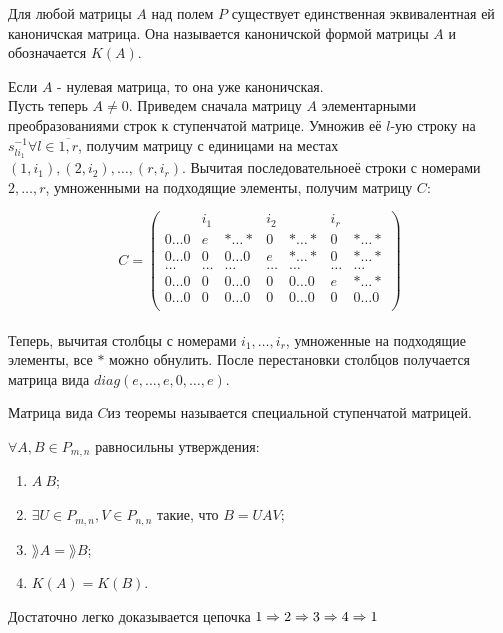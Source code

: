 \begin{proofs}
	Для любой матрицы $A$ над полем $P$ существует единственная эквивалентная ей каноничская матрица.
  Она называется каноничской формой матрицы $A$ и обозначается $K(A)$.
	\begin{dokvo}
    Если $A$ - нулевая матрица, то она уже каноничская.\\
    Пусть теперь $A \neq 0$. Приведем сначала матрицу $A$ элементарными преобразованиями строк к ступенчатой матрице.
    Умножив её $l$-ую строку на $s^{-1}_{li_1} \forall l \in \overline{1, r}$, получим матрицу
    с единицами на местах $(1, i_1), (2, i_2), \ldots, (r, i_r)$. Вычитая последовательноеё строки с номерами $2, \ldots, r$, умноженными
    на подходящие элементы, получим матрицу $C$:


    $$C =
    \begin{pmatrix}
      & i_1 & & i_2 & & i_r & \\
      0\ldots0 & e & *\ldots* & 0 & *\ldots* & 0 & *\ldots* \\
      0\ldots0 & 0 & 0\ldots0 & e & *\ldots* & 0 & *\ldots* \\
      \ldots & \ldots & \ldots & \ldots & \ldots & \ldots & \ldots \\
      0\ldots0 & 0 & 0\ldots0 & 0 & 0\ldots0 & e & *\ldots* \\
      0\ldots0 & 0 & 0\ldots0 & 0 & 0\ldots0 & 0 & 0\ldots0 \\
    \end{pmatrix}$$\\

    Теперь, вычитая столбцы с номерами $i_1, \ldots, i_r$, умноженные на подходящие элементы,
    все $*$ можно обнулить. После перестановки столбцов получается матрица вида $diag(e, \ldots, e, 0, \ldots, e)$.
	\end{dokvo}
\end{proofs}

\begin{defs}
	Матрица вида $C$из теоремы называется специальной ступенчатой матрицей.
\end{defs}

\begin{proofs}
	$\forall A,B \in P_{m,n}$ равносильны утверждения:
  \begin{enumerate}
  	\item $A~B$;
  	\item $\exists U \in P_{m,n}, V \in P_{n,n}$ такие, что $B = UAV$;
    \item $\rang{A} = \rang{B}$;
    \item $K(A) = K(B)$.
  \end{enumerate}
	\begin{dokvo}
    Достаточно легко доказывается цепочка $1 \Rightarrow 2 \Rightarrow 3 \Rightarrow 4 \Rightarrow 1$
	\end{dokvo}
\end{proofs}
\newpage
